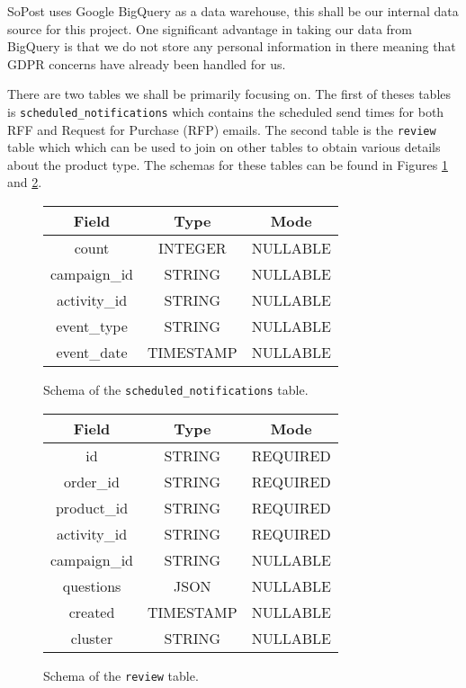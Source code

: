 \documentclass[12pt]{scrartcl}
\begin{document}
SoPost uses Google BigQuery as a data warehouse, this shall be our internal data source
for this project. One significant advantage in taking our data from BigQuery is that
we do not store any personal information in there meaning that GDPR concerns have already
been handled for us.

There are two tables we shall be primarily focusing on. The first of theses tables is
\texttt{scheduled\_notifications}
which contains the scheduled send times for both RFF and Request for Purchase (RFP) emails.
The second table is the \texttt{review} table which which can be used to join on other tables
to obtain various details about the product type. The schemas for these tables can be found
in Figures \ref{schema:scheduled_notifications} and \ref{schema:review}.

\begin{figure}
    \centering
    \begin{tabular}{ |c||c|c| }
        \hline
        \textbf{Field} & \textbf{Type} & \textbf{Mode} \\
        \hline
        count & INTEGER & NULLABLE \\
        campaign\_id & STRING & NULLABLE \\
        activity\_id & STRING & NULLABLE \\
        event\_type & STRING & NULLABLE \\
        event\_date & TIMESTAMP & NULLABLE \\
        \hline
    \end{tabular}
    \caption{Schema of the \texttt{scheduled\_notifications} table.}
    \label{schema:scheduled_notifications}
\end{figure}

\begin{figure}
    \centering
    \begin{tabular}{ |c||c|c| }
        \hline
        \textbf{Field} & \textbf{Type} & \textbf{Mode} \\
        \hline
        id & STRING & REQUIRED \\
        order\_id & STRING & REQUIRED \\
        product\_id & STRING & REQUIRED \\
        activity\_id & STRING & REQUIRED \\
        campaign\_id & STRING & NULLABLE \\
        questions & JSON & NULLABLE \\
        created & TIMESTAMP & NULLABLE \\
        cluster & STRING & NULLABLE \\
        \hline
    \end{tabular}
    \caption{Schema of the \texttt{review} table.}
    \label{schema:review}
\end{figure}
\end{document}
